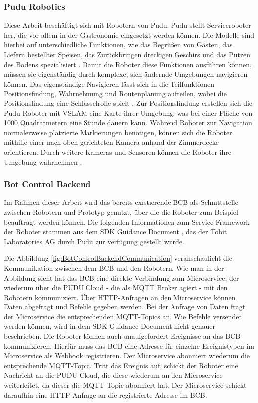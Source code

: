 \subsubsection{Pudu Robotics}
Diese Arbeit beschäftigt sich mit Robotern von Pudu. Pudu stellt Serviceroboter her, die vor allem in der Gastronomie eingesetzt werden können. Die Modelle sind hierbei auf unterschiedliche Funktionen, wie das Begrüßen von Gästen, das Liefern bestellter Speisen, das Zurückbringen dreckigen Geschirs und das Putzen des Bodens spezialisiert \cite{PUDU2024}. Damit die Roboter diese Funktionen ausführen können, müssen sie eigenständig durch komplexe, sich ändernde Umgebungen navigieren können. Das eigenständige Navigieren lässt sich in die Teilfunktionen Positionsfindung, Wahrnehmung und Routenplanung aufteilen, wobei die Positionsfindung eine Schlüsselrolle spielt \cite{Nature2022}. Zur Positionsfindung erstellen sich die Pudu Roboter mit \ac{VSLAM} eine Karte ihrer Umgebung, was bei einer Fläche von 1000 Quadratmetern eine Stunde dauern kann. Während Roboter zur Navigation normalerweise platzierte Markierungen benötigen, können sich die Roboter mithilfe einer nach oben gerichteten Kamera anhand der Zimmerdecke orientieren.\cite{Pudu2023} Durch weitere Kameras und Sensoren können die Roboter ihre Umgebung wahrnehmen \cite{Nature2022}.

\subsubsection{Bot Control Backend}\label{sec:BotControlBackend}
Im Rahmen dieser Arbeit wird das bereits existierende \ac{BCB} als Schnittstelle zwischen Robotern und Prototyp genutzt, über die die Roboter zum Beispiel beauftragt werden können. Die folgenden Informationen zum Service Framework der Roboter stammen aus dem SDK Guidance Document \cite{PuduSDK}, das der Tobit Laboratories AG durch Pudu zur verfügung gestellt wurde.

Die Abbildung \ref{fig:BotControlBackendCommunication} veranschaulicht die Kommunikation zwischen dem \ac{BCB} und den Robotern. Wie man in der Abbildung sieht hat das \ac{BCB} eine direkte Verbindung zum Microservice, der wiederum über die PUDU Cloud - die als MQTT Broker agiert - mit den Robotern kommuniziert. Über \gls{HTTP}-Anfragen an den Microservice können Daten abgefragt und Befehle gegeben werden. Bei der Anfrage von Daten fragt der Microservice die entsprechenden \gls{MQTT}-Topics an. Wie Befehle versendet werden können, wird in dem SDK Guidance Document nicht genauer beschrieben. Die Roboter können auch unaufgefordert Ereignisse an das \ac{BCB} kommunizieren. Hierfür muss das \ac{BCB} eine Adresse für einzelne Ereignistypen im Microservice als \gls{Webhook} registrieren. Der Microservice abonniert wiederum die entsprechende \gls{MQTT}-Topic. Tritt das Ereignis auf, schickt der Roboter eine Nachricht an die PUDU Cloud, die diese wiederum an den Microservice weiterleitet, da dieser die \gls{MQTT}-Topic abonniert hat. Der Microservice schickt daraufhin eine HTTP-Anfrage an die registrierte Adresse im \ac{BCB}.


